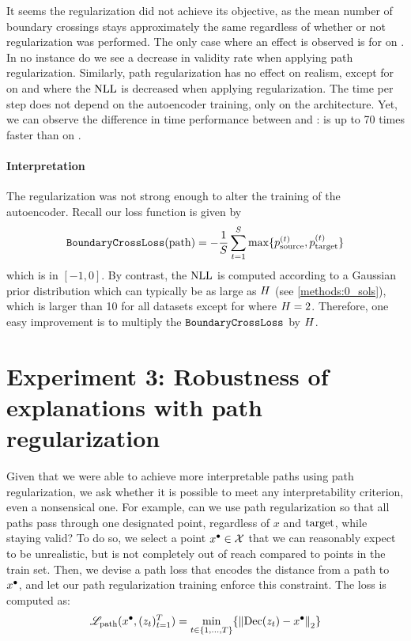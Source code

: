 \documentclass[../main.tex]{subfiles}
\begin{document}
It seems the regularization did not achieve its objective, as the mean number of boundary crossings stays approximately the same regardless of whether or not regularization was performed.
The only case where an effect is observed is for \revise{} on \CakeOnSea{}.
In no instance do we see a decrease in validity rate when applying path regularization.
Similarly, path regularization has no effect on realism, except for \ls{} on \CakeOnSea{} and \ForestCover{} where the $\text{NLL}$ is decreased when applying regularization.
The time per step does not depend on the autoencoder training, only on the architecture.
Yet, we can observe the difference in time performance between \ls{} and \revise{}: \ls{} is up to 70 times faster than \revise{} on \OnlineNewsPopularity{}.

\paragraph{Interpretation}

The regularization was not strong enough to alter the training of the autoencoder.
Recall our loss function is given by
\begin{align*}
    \mathtt{BoundaryCrossLoss}(\mathrm{path}) =
    - \frac{1}{S} \sum_{t=1}^{S}
    \max \{ p^{(t)}_{\mathrm{source}}, p^{(t)}_{\mathrm{target}} \}
\end{align*}
which is in $[-1, 0]$.
By contrast, the $\text{NLL}$ is computed according to a Gaussian prior distribution which can typically be as large as $H$ (see \autoref{methods:0_sols}), which is larger than 10 for all datasets except for \CakeOnSea{} where $H=2$.
Therefore, one easy improvement is to multiply the $\mathtt{BoundaryCrossLoss}$ by $H$.

\section{Experiment 3: Robustness of explanations with path regularization}

Given that we were able to achieve more interpretable paths using path regularization, we ask whether it is possible to meet any interpretability criterion, even a nonsensical one.
For example, can we use path regularization so that all paths pass through one designated point, regardless of $x$ and $\mathrm{target}$, while staying valid?
To do so, we select a point $x^\bullet \in \mathcal{X}$ that we can reasonably expect to be unrealistic, but is not completely out of reach compared to points in the train set.
Then, we devise a path loss that encodes the distance from a path to $x^\bullet$, and let our path regularization training enforce this constraint.
The loss is computed as:
\begin{align*}
    \mathscr{L}_\text{path}(x^\bullet, (z_t)_{t=1}^T) = \min_{t \in \{1, \ldots, T\}} \{ \left\lVert\operatorname{Dec}(z_t) - x^\bullet\right\rVert_2 \}
\end{align*}
\end{document}
